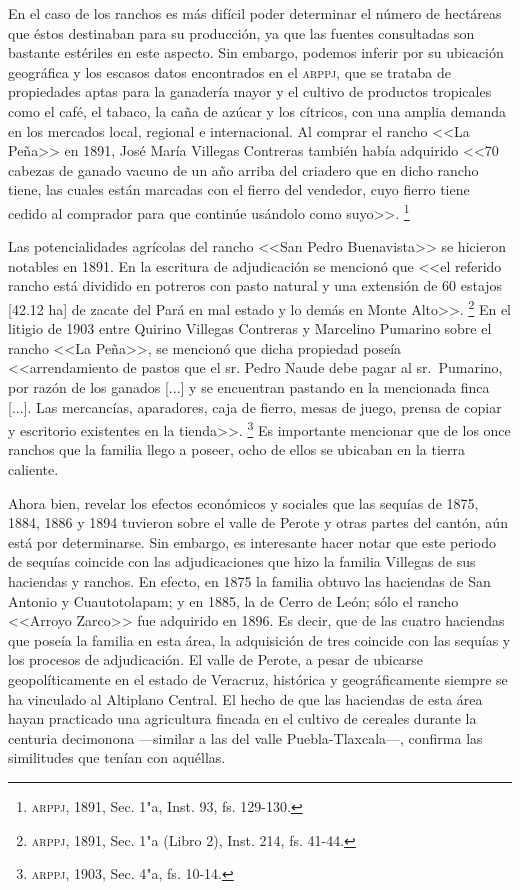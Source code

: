 \documentclass[14pt,twoside,final]{extbook} %
\let\oldfootnote\footnote
\renewcommand\footnote[1]{%
\oldfootnote{\hspace{1mm}#1}}
\begin{document}
En el caso de los ranchos es más difícil poder determinar el número de hectáreas que éstos destinaban para su producción, ya que las fuentes consultadas son bastante estériles en este aspecto. Sin embargo, podemos inferir por su ubicación geográfica y los escasos datos encontrados en el \textsc{arppj}, que se trataba de propiedades aptas para la ganadería mayor y el cultivo de productos tropicales como el café, el tabaco, la caña de azúcar y los cítricos, con una amplia demanda en los mercados local, regional e internacional. Al comprar el rancho <<La Peña>> en 1891, José María Villegas Contreras también había adquirido <<70 cabezas de ganado vacuno de un año arriba del
criadero que en dicho rancho tiene, las cuales están marcadas con el fierro del vendedor, cuyo fierro tiene cedido al comprador para que continúe usándolo como suyo>>.\footnote{\textsc{arppj}, 1891, Sec. 1"a, Inst. 93, fs. 129-130.}

Las potencialidades agrícolas del rancho <<San Pedro Buenavista>> se hicieron notables en 1891. En la escritura de adjudicación se mencionó que <<el referido rancho está dividido en potreros con pasto natural y una extensión de 60 estajos [42.12 ha] de zacate del Pará en mal estado y lo demás en Monte Alto>>.\footnote{\textsc{arppj}, 1891, Sec. 1"a (Libro 2), Inst. 214, fs. 41-44.} En el litigio de 1903 entre Quirino Villegas Contreras y Marcelino Pumarino sobre el rancho <<La Peña>>, se mencionó que dicha propiedad poseía <<arrendamiento de pastos que el sr. Pedro Naude debe pagar al sr.~Pumarino, por razón de los ganados [...] y se encuentran pastando en la mencionada finca [...]. Las mercancías, aparadores, caja de fierro, mesas de juego, prensa de copiar y escritorio existentes en la tienda>>.\footnote{\textsc{arppj}, 1903, Sec. 4"a, fs. 10-14.} Es importante mencionar que de los once ranchos que la familia llego a poseer, ocho de ellos se ubicaban en la tierra caliente.

Ahora bien, revelar los efectos económicos y sociales que las sequías de 1875, 1884, 1886 y 1894 tuvieron sobre el valle de Perote y otras partes del cantón, aún está por determinarse. Sin embargo, es interesante hacer notar que este periodo de sequías coincide con las adjudicaciones que hizo la familia Villegas de sus haciendas y ranchos. En efecto, en 1875 la familia obtuvo las haciendas de San Antonio y Cuautotolapam; y en 1885, la de Cerro de León; sólo el rancho <<Arroyo Zarco>> fue adquirido en 1896. Es decir, que de las cuatro haciendas que poseía la familia en esta área, la adquisición de tres coincide con las sequías y los procesos de adjudicación. El valle de Perote, a pesar de ubicarse geopolíticamente en el estado de Veracruz, histórica y geográficamente siempre se ha vinculado al Altiplano Central. El hecho de que las haciendas de esta área hayan practicado una agricultura fincada en el cultivo de cereales durante la centuria decimonona ---similar a las del valle Puebla-Tlaxcala---, confirma las similitudes que tenían con aquéllas. \pagebreak[4]
\end{document}
